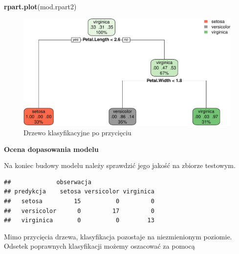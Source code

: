 \documentclass[
]{book}
\newenvironment{Shaded}{\begin{snugshade}}{\end{snugshade}}
\newcommand{\AttributeTok}[1]{\textcolor[rgb]{0.13,0.29,0.53}{#1}}
\newcommand{\FunctionTok}[1]{\textcolor[rgb]{0.13,0.29,0.53}{\textbf{#1}}}
\newcommand{\NormalTok}[1]{#1}
\newcommand{\OtherTok}[1]{\textcolor[rgb]{0.56,0.35,0.01}{#1}}
\newcommand{\SpecialCharTok}[1]{\textcolor[rgb]{0.81,0.36,0.00}{\textbf{#1}}}
\newcommand{\StringTok}[1]{\textcolor[rgb]{0.31,0.60,0.02}{#1}}
\theoremstyle{plain}
\theoremstyle{definition}
\theoremstyle{definition}
\theoremstyle{definition}
\theoremstyle{definition}
\theoremstyle{definition}
\theoremstyle{remark}
\begin{document}
\begin{Shaded}
\begin{Highlighting}[]
\FunctionTok{rpart.plot}\NormalTok{(mod.rpart2)}
\end{Highlighting}
\end{Shaded}

\begin{figure}
\centering
\includegraphics{EksploracjaDanych_files/figure-latex/unnamed-chunk-18-1.pdf}
\caption{\label{fig:unnamed-chunk-18}Drzewo klasyfikacyjne po przycięciu}
\end{figure}

\textbf{Ocena dopasowania modelu}

Na koniec budowy modelu należy sprawdzić jego jakość na zbiorze testowym.

\begin{Shaded}
\end{Shaded}

\begin{verbatim}
##             obserwacja
## predykcja    setosa versicolor virginica
##   setosa         15          0         0
##   versicolor      0         17         0
##   virginica       0          0        13
\end{verbatim}

Mimo przycięcia drzewa, klasyfikacja pozostaje na niezmienionym poziomie. Odsetek poprawnych klasyfikacji możemy oszacować za pomocą
\end{document}
